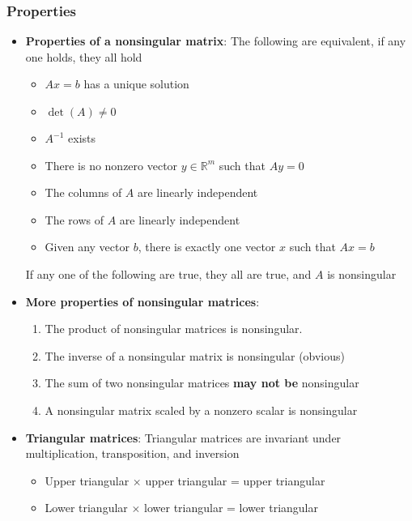 \documentclass{report}
\begin{document}
    \pagebreak 
    \bigbreak \noindent 
    \subsubsection{Properties}
    \begin{itemize}
        \item \textbf{Properties of a nonsingular matrix}:
            The following are equivalent, if any one holds, they all hold
            \begin{itemize}
                \item $Ax = b$ has a unique solution
                \item $\det(A)\ne 0$
                \item $A^{-1}$ exists
                \item There is no nonzero vector $y \in \mathbb{R}^{m}$ such that $Ay=0 $
                \item The columns of $A$ are linearly independent
                \item The rows of $A$ are linearly independent
                \item Given any vector $b$, there is exactly one vector $x$ such that $Ax=b$
            \end{itemize}
            If any one of the following are true, they all are true, and $A$ is nonsingular
        \item \textbf{More properties of nonsingular matrices}:
            \begin{enumerate}
                \item The product of nonsingular matrices is nonsingular.
                \item The inverse of a nonsingular matrix is nonsingular (obvious)
                \item The sum of two nonsingular matrices \textbf{may not be} nonsingular
                \item A nonsingular matrix scaled by a nonzero scalar is nonsingular
            \end{enumerate}
        \item \textbf{Triangular matrices}: 
            Triangular matrices are invariant under multiplication, transposition, and inversion
            \begin{itemize}
                \item Upper triangular $\times$ upper triangular = upper triangular
                \item Lower triangular $\times$ lower triangular = lower triangular

\end{itemize}
\end{itemize}
\end{document}
